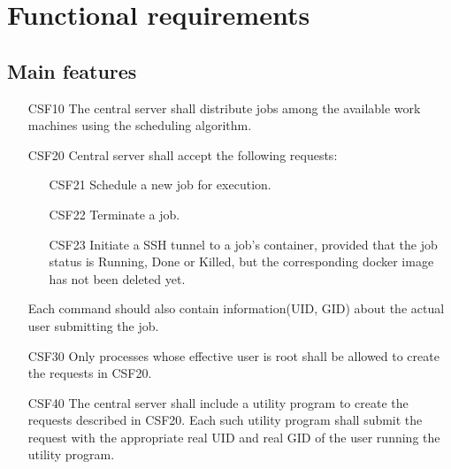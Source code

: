 \section{Functional requirements}
\subsection{Main features}
\begin{enumerate}
  \item[CSF10] The central server shall distribute \glspl{job}
    among the available work machines using the scheduling algorithm.
  \item[CSF20] Central server shall accept the following requests:
  \begin{enumerate}
    \item[CSF21] Schedule a new \gls{job} for execution.
    \item[CSF22] Terminate a \gls{job}.
    \item[CSF23] Initiate a SSH tunnel to a \gls{job}'s container, provided that the
      \gls{job status} is Running, Done or Killed, but the corresponding docker image
      has not been deleted yet.
  \end{enumerate}
    Each command should also contain information(\gls{UID}, \gls{GID}) about the actual user submitting the job.
  \item[CSF30] Only processes whose effective user is root shall be allowed to create the requests in CSF20.
  \item[CSF40] The central server shall include a utility program to create the requests described in CSF20.
    Each such utility program shall submit the request with the appropriate real \gls{UID} and real \gls{GID}
    of the user running the utility program.


\end{enumerate}

